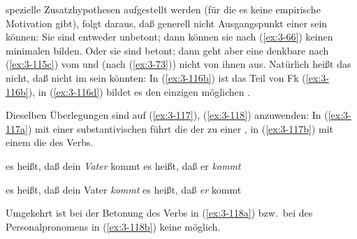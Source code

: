 \documentclass[output=paper]{langsci/langscibook}
\begin{document}
spezielle Zusatzhypothesen aufgestellt werden (für die es keine empirische Motivation gibt), folgt daraus, daß 
generell nicht Ausgangspunkt einer  sein können: Sie sind entweder unbetont; dann können sie nach (\ref{ex:3-66}) keinen minimalen
 bilden. Oder sie sind betont; dann geht aber eine denkbare  nach (\ref{ex:3-115c}) vom  und (nach (\ref{ex:3-73})) nicht von
ihnen aus. Natürlich heißt das nicht, daß  nicht im  sein könnten: In (\ref{ex:3-116b}) ist das  Teil von Fk
(\ref{ex:3-116b}), in (\ref{ex:3-116d}) bildet es den einzigen möglichen .

Dieselben Überlegungen sind auf (\ref{ex:3-117}), (\ref{ex:3-118}) anzuwenden: In (\ref{ex:3-117a}) mit einer substantivischen  führt die  der  zu einer
, in (\ref{ex:3-117b}) mit einem  die 
des Verbs.
\begin{exe}
\ex
\label{ex:3-117}
\begin{xlist}
\ex
\label{ex:3-117a}
es heißt, daß dein \textit{Vater} kommt
\ex
\label{ex:3-117b}
es heißt, daß er \textit{kommt}
\end{xlist}
\ex
\label{ex:3-118}
\begin{xlist}
\ex
\label{ex:3-118a}
es heißt, daß dein Vater \textit{kommt}
\ex
\label{ex:3-118b}
es heißt, daß \textit{er} kommt
\end{xlist}
\end{exe}
Umgekehrt ist bei der Betonung des Verbs in (\ref{ex:3-118a}) bzw.\ bei 
des Personalpronomens in (\ref{ex:3-118b}) keine  möglich.
\end{document}

